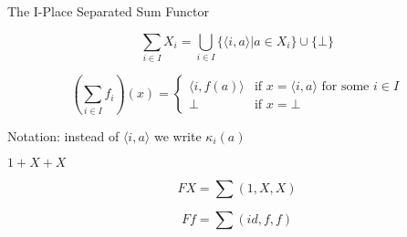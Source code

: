 \documentclass{beamer}
\begin{document}
\begin{frame}{The I-Place Separated Sum Functor}

\begin{equation}
\sum_{i \in I}{X_i} =
  \bigcup_{i \in I} \{ \langle i, a \rangle | a \in X_i \}
  \cup \{ \bot \} \nonumber
\end{equation}

\begin{equation*}
( \sum_{i \in I}f_i ) (x) = \left\{
  \begin{array}{rl}
     \langle i, f(a) \rangle & \text{if } x = \langle i, a \rangle
                               \text{ for some } i \in I \\
    \bot                     & \text{if } x = \bot
  \end{array} \right.
\end{equation*}

\bigskip

Notation: instead of $\langle i, a \rangle$ we write $\kappa_i(a)$

\end{frame}


\begin{frame}{$1+X+X$}

\begin{equation*}
FX = \sum{(1, X, X)}
\end{equation*}

\begin{equation*}
Ff = \sum{(id, f, f)}
\end{equation*}

\end{frame}
\end{document}
